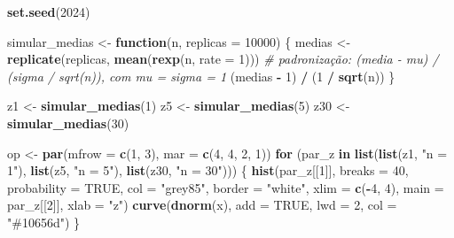 \documentclass[
  portuguese,
  11pt,
  openany]{book}
\newenvironment{Shaded}{\begin{snugshade}}{\end{snugshade}}
\newcommand{\AttributeTok}[1]{\textcolor[rgb]{0.13,0.29,0.53}{#1}}
\newcommand{\CommentTok}[1]{\textcolor[rgb]{0.56,0.35,0.01}{\textit{#1}}}
\newcommand{\ConstantTok}[1]{\textcolor[rgb]{0.56,0.35,0.01}{#1}}
\newcommand{\ControlFlowTok}[1]{\textcolor[rgb]{0.13,0.29,0.53}{\textbf{#1}}}
\newcommand{\DecValTok}[1]{\textcolor[rgb]{0.00,0.00,0.81}{#1}}
\newcommand{\FunctionTok}[1]{\textcolor[rgb]{0.13,0.29,0.53}{\textbf{#1}}}
\newcommand{\NormalTok}[1]{#1}
\newcommand{\OtherTok}[1]{\textcolor[rgb]{0.56,0.35,0.01}{#1}}
\newcommand{\SpecialCharTok}[1]{\textcolor[rgb]{0.81,0.36,0.00}{\textbf{#1}}}
\newcommand{\StringTok}[1]{\textcolor[rgb]{0.31,0.60,0.02}{#1}}
\begin{document}
\begin{Shaded}
\begin{Highlighting}[]
\FunctionTok{set.seed}\NormalTok{(}\DecValTok{2024}\NormalTok{)}

\NormalTok{simular\_medias }\OtherTok{\textless{}{-}} \ControlFlowTok{function}\NormalTok{(n, }\AttributeTok{replicas =} \DecValTok{10000}\NormalTok{) \{}
\NormalTok{  medias }\OtherTok{\textless{}{-}} \FunctionTok{replicate}\NormalTok{(replicas, }\FunctionTok{mean}\NormalTok{(}\FunctionTok{rexp}\NormalTok{(n, }\AttributeTok{rate =} \DecValTok{1}\NormalTok{)))}
  \CommentTok{\# padronização: (media {-} mu) / (sigma / sqrt(n)), com mu = sigma = 1}
\NormalTok{  (medias }\SpecialCharTok{{-}} \DecValTok{1}\NormalTok{) }\SpecialCharTok{/}\NormalTok{ (}\DecValTok{1} \SpecialCharTok{/} \FunctionTok{sqrt}\NormalTok{(n))}
\NormalTok{\}}

\NormalTok{z1  }\OtherTok{\textless{}{-}} \FunctionTok{simular\_medias}\NormalTok{(}\DecValTok{1}\NormalTok{)}
\NormalTok{z5  }\OtherTok{\textless{}{-}} \FunctionTok{simular\_medias}\NormalTok{(}\DecValTok{5}\NormalTok{)}
\NormalTok{z30 }\OtherTok{\textless{}{-}} \FunctionTok{simular\_medias}\NormalTok{(}\DecValTok{30}\NormalTok{)}
\end{Highlighting}
\end{Shaded}

\begin{Shaded}
\begin{Highlighting}[]
\NormalTok{op }\OtherTok{\textless{}{-}} \FunctionTok{par}\NormalTok{(}\AttributeTok{mfrow =} \FunctionTok{c}\NormalTok{(}\DecValTok{1}\NormalTok{, }\DecValTok{3}\NormalTok{), }\AttributeTok{mar =} \FunctionTok{c}\NormalTok{(}\DecValTok{4}\NormalTok{, }\DecValTok{4}\NormalTok{, }\DecValTok{2}\NormalTok{, }\DecValTok{1}\NormalTok{))}
\ControlFlowTok{for}\NormalTok{ (par\_z }\ControlFlowTok{in} \FunctionTok{list}\NormalTok{(}\FunctionTok{list}\NormalTok{(z1, }\StringTok{"n = 1"}\NormalTok{), }\FunctionTok{list}\NormalTok{(z5, }\StringTok{"n = 5"}\NormalTok{),}
                    \FunctionTok{list}\NormalTok{(z30, }\StringTok{"n = 30"}\NormalTok{))) \{}
  \FunctionTok{hist}\NormalTok{(par\_z[[}\DecValTok{1}\NormalTok{]], }\AttributeTok{breaks =} \DecValTok{40}\NormalTok{, }\AttributeTok{probability =} \ConstantTok{TRUE}\NormalTok{,}
       \AttributeTok{col =} \StringTok{"grey85"}\NormalTok{, }\AttributeTok{border =} \StringTok{"white"}\NormalTok{,}
       \AttributeTok{xlim =} \FunctionTok{c}\NormalTok{(}\SpecialCharTok{{-}}\DecValTok{4}\NormalTok{, }\DecValTok{4}\NormalTok{), }\AttributeTok{main =}\NormalTok{ par\_z[[}\DecValTok{2}\NormalTok{]], }\AttributeTok{xlab =} \StringTok{"z"}\NormalTok{)}
  \FunctionTok{curve}\NormalTok{(}\FunctionTok{dnorm}\NormalTok{(x), }\AttributeTok{add =} \ConstantTok{TRUE}\NormalTok{, }\AttributeTok{lwd =} \DecValTok{2}\NormalTok{, }\AttributeTok{col =} \StringTok{"\#10656d"}\NormalTok{)}
\NormalTok{\}}
\end{Highlighting}
\end{Shaded}
\end{document}
